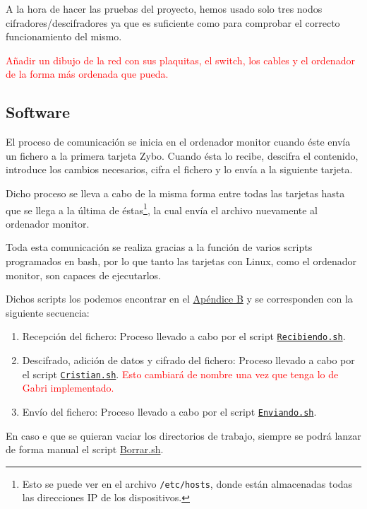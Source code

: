 A la hora de hacer las pruebas del proyecto, hemos usado solo tres nodos cifradores/descifradores ya que es suficiente como para comprobar el correcto funcionamiento del mismo.

\textcolor{red}{Añadir un dibujo de la red con sus plaquitas, el switch, los cables y el ordenador de la forma más ordenada que pueda.}

\subsection{Software}
El proceso de comunicación se inicia en el ordenador monitor cuando éste envía un fichero a la primera tarjeta Zybo. Cuando ésta lo recibe, descifra el contenido, introduce los cambios necesarios, cifra el fichero y lo envía a la siguiente tarjeta.

Dicho proceso se lleva a cabo de la misma forma entre todas las tarjetas hasta que se llega a la última de éstas\footnote{Esto se puede ver en el archivo \texttt{/etc/hosts}, donde están almacenadas todas las direcciones IP de los dispositivos.}, la cual envía el archivo nuevamente al ordenador monitor.

Toda esta comunicación se realiza gracias a la función de varios scripts programados en bash, por lo que tanto las tarjetas con Linux, como el ordenador monitor, son capaces de ejecutarlos.

Dichos scripts los podemos encontrar en el \hyperlink{Scripts}{Apéndice B} y se corresponden con la siguiente secuencia:
\begin{enumerate}
	\item Recepción del fichero: Proceso llevado a cabo por el script \hyperlink{ScriptRecibiendo}{\texttt{Recibiendo.sh}}.
	\item Descifrado, adición de datos y cifrado del fichero: Proceso llevado a cabo por el script \hyperlink{ScriptCristian}{\texttt{Cristian.sh}}. \textcolor{red}{Esto cambiará de nombre una vez que tenga lo de Gabri implementado.}
	\item Envío del fichero: Proceso llevado a cabo por el script \hyperlink{ScriptEnviando}{\texttt{Enviando.sh}}.
\end{enumerate}

En caso e que se quieran vaciar los directorios de trabajo, siempre se podrá lanzar de forma manual el script \hyperlink{ScriptBorrar}{Borrar.sh}.